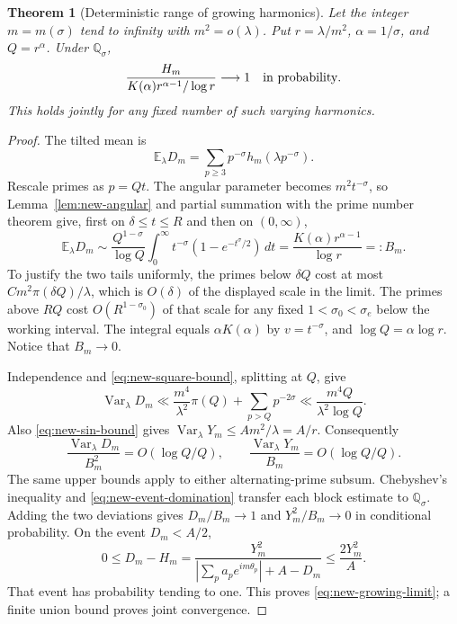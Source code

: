 \documentclass[11pt,a4paper]{article}
\newtheorem{theorem}{Theorem}[section]
\theoremstyle{definition}
\theoremstyle{remark}\newtheorem{remark}[theorem]{Remark}
\begin{document}
\begin{theorem}[Deterministic range of growing harmonics]
\label{thm:new-growing}
Let the integer $m=m(\sigma)$ tend to infinity with $m^2=o(\lambda)$.
Put $r=\lambda/m^2$, $\alpha=1/\sigma$, and $Q=r^\alpha$.  Under
$\mathbb Q_\sigma$,
\begin{equation}\label{eq:new-growing-limit}
 \frac{H_m}{K(\alpha)r^{\alpha-1}/\log r}
       \longrightarrow1\quad\hbox{in probability}.
\end{equation}
This holds jointly for any fixed number of such varying harmonics.
\end{theorem}

\begin{proof}
The tilted mean is
\[
 \mathbb E_\lambda D_m
   =\sum_{p\geq3}p^{-\sigma}h_m(\lambda p^{-\sigma}).
\]
Rescale primes as $p=Qt$.  The angular parameter becomes $m^2t^{-\sigma}$,
so Lemma~\ref{lem:new-angular} and partial summation with the prime number
theorem give, first on $\delta\leq t\leq R$ and then on $(0,\infty)$,
\[
 \mathbb E_\lambda D_m\sim
 \frac{Q^{1-\sigma}}{\log Q}
 \int_0^\infty t^{-\sigma}(1-e^{-t^\sigma/2})\,dt
 =\frac{K(\alpha)r^{\alpha-1}}{\log r}=:B_m.
\]
To justify the two tails uniformly, the primes below $\delta Q$ cost at
most $Cm^2\pi(\delta Q)/\lambda$, which is $O(\delta)$ of the displayed
scale in the limit.  The primes above $RQ$ cost
$O(R^{1-\sigma_0})$ of that scale for any fixed
$1<\sigma_0<\sigma_e$ below the working interval.  The integral equals
$\alpha K(\alpha)$ by $v=t^{-\sigma}$, and
$\log Q=\alpha\log r$.  Notice that $B_m\to0$.

Independence and \eqref{eq:new-square-bound}, splitting at $Q$, give
\[
 \operatorname{Var}_\lambda D_m
 \ll\frac{m^4}{\lambda^2}\pi(Q)+\sum_{p>Q}p^{-2\sigma}
 \ll\frac{m^4Q}{\lambda^2\log Q}.
\]
Also \eqref{eq:new-sin-bound} gives
$\operatorname{Var}_\lambda Y_m\leq Am^2/\lambda=A/r$.
Consequently
\[
 \frac{\operatorname{Var}_\lambda D_m}{B_m^2}
       =O(\log Q/Q),\qquad
 \frac{\operatorname{Var}_\lambda Y_m}{B_m}
       =O(\log Q/Q).
\]
The same upper bounds apply to either alternating-prime subsum.
Chebyshev's inequality and \eqref{eq:new-event-domination} transfer each
block estimate to $\mathbb Q_\sigma$.  Adding the two deviations gives
$D_m/B_m\to1$ and $Y_m^2/B_m\to0$ in conditional probability.
On the event $D_m<A/2$,
\[
 0\leq D_m-H_m
  =\frac{Y_m^2}{|\sum_pa_pe^{im\theta_p}|+A-D_m}
  \leq\frac{2Y_m^2}{A}.
\]
That event has probability tending to one.  This proves
\eqref{eq:new-growing-limit}; a finite union bound proves joint convergence.
\end{proof}
\end{document}
